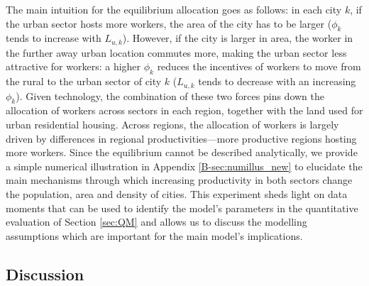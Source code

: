 \documentclass[20250130-paper.tex]{subfiles}
\begin{document}
The main intuition for the equilibrium allocation goes as follows: in each city $k$, if the urban sector hosts more workers, the area of the city has to be larger ($\phi_k$ tends to increase with $L_{u,k}$). However, if the city is larger in area, the worker in the further away urban location commutes more, making the urban sector less attractive for workers: a higher $\phi_k$ reduces the incentives of workers to move from the rural to the urban sector of city $k$ ($L_{u,k}$ tends to decrease with an increasing $\phi_k$). Given technology, the combination of these two forces pins down the allocation of workers across sectors in each region, together with the land used for urban residential housing. Across regions, the allocation of workers is largely driven by differences in regional productivities---more productive regions hosting more workers. Since the equilibrium cannot be described analytically, we provide a simple numerical illustration in Appendix \ref{B-sec:numillus_new} to elucidate the main mechanisms through which increasing productivity in both sectors change the population, area and density of cities. This experiment sheds light on data moments that can be used to identify the model's parameters in the quantitative evaluation of Section \ref{sec:QM} and allows us to discuss the modelling assumptions which are important for the main model's implications. 



\subsection{Discussion} \label{sec:discussion}
\end{document}
